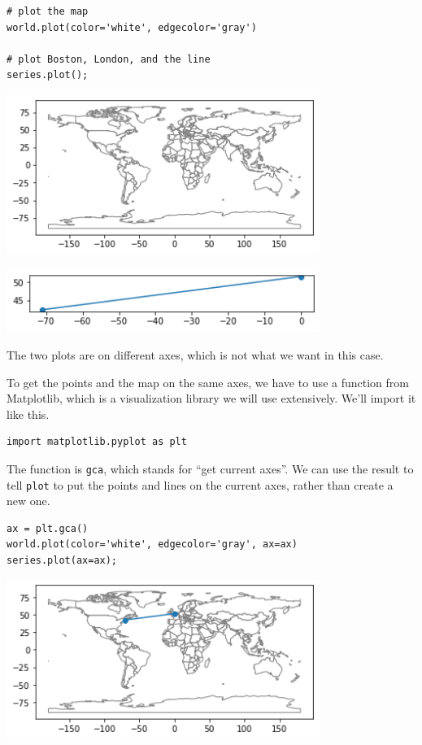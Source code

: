 \begin{lstlisting}[]
# plot the map
world.plot(color='white', edgecolor='gray')

# plot Boston, London, and the line
series.plot();
\end{lstlisting}

\begin{center}
\includegraphics[width=4in]{chapters/02_times_files/02_times_126_0.png}
\end{center}

\begin{center}
\includegraphics[width=4in]{chapters/02_times_files/02_times_126_1.png}
\end{center}

The two plots are on different axes, which is not what we want in this
case.

To get the points and the map on the same axes, we have to use a
function from Matplotlib, which is a visualization library we will use
extensively. We'll import it like this.

\begin{lstlisting}[]
import matplotlib.pyplot as plt
\end{lstlisting}

The function is \passthrough{\lstinline!gca!}, which stands for ``get
current axes''. We can use the result to tell
\passthrough{\lstinline!plot!} to put the points and lines on the
current axes, rather than create a new one.

\begin{lstlisting}[]
ax = plt.gca()
world.plot(color='white', edgecolor='gray', ax=ax)
series.plot(ax=ax);
\end{lstlisting}

\begin{center}
\includegraphics[width=4in]{chapters/02_times_files/02_times_130_0.png}
\end{center}

